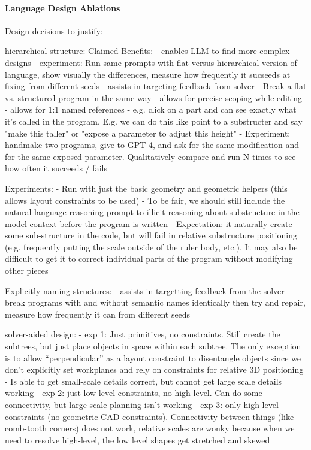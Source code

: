 \paragraph{Language Design Ablations}

Design decisions to justify:

hierarchical structure:
Claimed Benefits:
 - enables LLM to find more complex designs
   - experiment: Run same prompts with flat versus hierarchical version of language, show visually the differences, measure how frequently it sucseeds at fixing from different seeds
 - assists in targeting feedback from solver
   - Break a flat vs. structured program in the same way
 - allows for precise scoping while editing
 - allows for 1:1 named references - e.g. click on a part and can see exactly what it's called in the program. E.g. we can do this like point to a substructer and say "make this taller" or "expose a parameter to adjust this height"
    - Experiment: handmake two programs, give to GPT-4, and ask for the same modification and for the same exposed parameter. Qualitatively compare and run N times to see how often it succeeds / fails

Experiments:
- Run with just the basic geometry and geometric helpers (this allows layout constraints to be used)
- To be fair, we should still include the natural-language reasoning prompt to illicit reasoning about substructure in the model context before the program is written
- Expectation: it naturally create some sub-structure in the code, but will fail in relative substructure positioning (e.g. frequently putting the scale outside of the ruler body, etc.). It may also be difficult to get it to correct individual parts of the program without modifying other pieces

Explicitly naming structures:
- assists in targetting feedback from the solver
  -  break programs with and without semantic names identically then try and repair, measure how frequently it can from different seeds

solver-aided design:
- exp 1: Just primitives, no constraints. Still create the subtrees, but just place objects in space within each subtree. The only exception is to allow ``perpendicular'' as a layout constraint to disentangle objects since we don't explicitly set workplanes and rely on constraints for relative 3D positioning
   - Is able to get small-scale details correct, but cannot get large scale details working
- exp 2: just low-level constraints, no high level. Can do some connectivity, but large-scale planning isn't working
- exp 3: only high-level constraints (no geometric CAD constraints). Connectivity between things (like comb-tooth corners) does not work, relative scales are wonky because when we need to resolve high-level, the low level shapes get stretched and skewed

